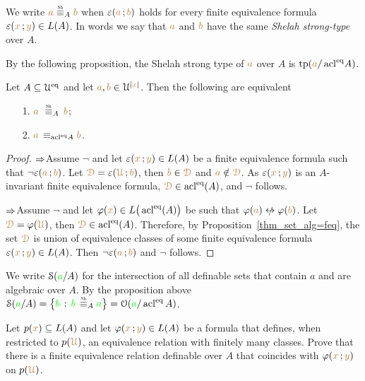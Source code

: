 \documentclass[creche.tex]{subfiles}
\begin{document}
\begin{definition}\label{def_Sh_strong_type}
We write \emph{${\mr a}\stackrel{\smash{\scalebox{.5}{\rm Sh}}}{\equiv}_A{\mr b}$} when $\varepsilon({\color{brown} a}\,;{\color{brown} b})$ holds for every finite equivalence formula $\varepsilon({\color{brown} x}\,;{\color{brown} y})\in L(A)$.
In words we say that ${\color{brown} a}$ and ${\color{brown} b}$ have the same \emph{Shelah strong-type\/} over $A$.\QED
\end{definition}

By the following proposition, the Shelah strong type of ${\color{brown} a}$ over $A$ is ${\rm tp}({\color{brown} a}/\mathop{\rm acl}^{{\rm eq}}\!A)$.


\begin{proposition}\label{prop_Shelah_strong_types}
Let $A\subseteq\EuScript U^{{\rm eq}}$ and let ${\color{brown} a},{\color{brown} b}\in\EuScript U^{|{\color{brown} x}|}$.
Then the following are equivalent\nobreak
\begin{itemize}
\item[1.]  ${\mr a}\ \equivSh_A\, {\mr b}$;
\item[2.]  ${\color{brown} a}\,\equiv_{\mathop{\rm acl}^{{\rm eq}}\! A}{\color{brown} b}$.
\end{itemize} 
\end{proposition}
\begin{proof}
$\Rightarrow$\quad Assume $\neg$ and let $\varepsilon({\color{brown} x}\,;{\color{brown} y})\in L(A)$ be a finite equivalence formula such that $\neg\varepsilon({\color{brown} a}\,;{\color{brown} b})$.
Let ${\color{brown}\EuScript D}=\varepsilon({\color{brown}\EuScript U}\,;{\color{brown} b})$, then  ${\color{brown} b}\in{\color{brown}\EuScript D}$ and ${\color{brown} a}\notin{\color{brown}\EuScript D}$.
As $\varepsilon({\color{brown} x}\,;{\color{brown} y})$ is an $A$-invariant finite equivalence formula, ${\color{brown}\EuScript D}\in\mathop{\rm acl}^{{\rm eq}}(A)$, and $\neg$ follows.


$\Rightarrow$\quad Assume $\neg$ and let $\varphi({\color{brown} x})\in L\big(\mathop{\rm acl}^{{\rm eq}}(A)\big)$ be  such that $\phi({\mr a})\niff\phi({\mr b})$.
Let ${\color{brown}\EuScript D}=\varphi({\color{brown}\EuScript U})$, then ${\color{brown}\EuScript D}\in\mathop{\rm acl}^{{\rm eq}}(A)$.
Therefore, by Proposition~\ref{thm_set_alg=feq}, the set ${\color{brown}\EuScript D}$ is union of equivalence classes of some finite equivalence formula $\varepsilon({\color{brown} x}\,;{\color{brown} y})\in L(A)$.
Then $\neg\varepsilon({\color{brown} a}\,;{\color{brown} b})$ and $\neg$ follows.
\end{proof}

\noindent\llap{\textcolor{red}{\Large\danger}\kern1.5ex}We write \emph{$\EuScript S({\color{green} a}/A)$\/} for the intersection of all definable sets that contain $a$ and are algebraic over $A$.
By the proposition above $\S({\gr a}/A)=\big\{{\gr b}\,:\,{\gr b}\,\equivSh_A {\gr a}\big\}=\O({\gr a}/\acl^\eq A)$.


\begin{exercise}
Let $p({\color{brown} x})\subseteq L(A)$ and let $\varphi({\color{brown} x}\,;{\color{brown} y})\in L(A)$ be a formula that defines, when restricted to $p({\color{brown}\EuScript U})$, an equivalence relation with finitely many classes.
Prove that there is a finite equivalence relation definable over $A$ that coincides with $\varphi({\color{brown} x}\,;{\color{brown} y})$ on $p({\color{brown}\EuScript U})$.\QED
\end{exercise}
\end{document}
